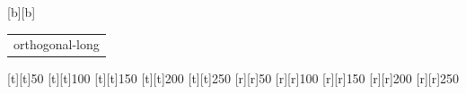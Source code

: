 %    
%
%
\begin{psfrags}%
\psfragscanon%
%
[b][b]{\color[rgb]{0,0,0}\setlength{\tabcolsep}{0pt}\begin{tabular}{c}orthogonal-long\end{tabular}}%
%
[t][t]{50}%
[t][t]{100}%
[t][t]{150}%
[t][t]{200}%
[t][t]{250}%
%
[r][r]{50}%
[r][r]{100}%
[r][r]{150}%
[r][r]{200}%
[r][r]{250}%
%
%
\end{psfrags}%
%

